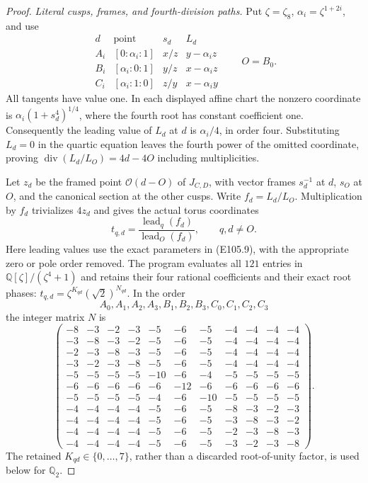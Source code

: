 \begin{proof}
\emph{Literal cusps, frames, and fourth-division paths.}
Put $\zeta=\zeta_8$, $\alpha_i=\zeta^{1+2i}$, and use
\[
 \begin{array}{c|c|c|c}
 d&\text{point}&s_d&L_d\\ \hline
 A_i&[0:\alpha_i:1]&x/z&y-\alpha_i z\\
 B_i&[\alpha_i:0:1]&y/z&x-\alpha_i z\\
 C_i&[\alpha_i:1:0]&z/y&x-\alpha_i y
 \end{array}
 \qquad O=B_0.
 \tag{E105.9}
\]
All tangents have value one.  In each displayed affine chart
the nonzero coordinate is $\alpha_i(1+s_d^4)^{1/4}$, where
the fourth root has constant coefficient one.  Consequently
the leading value of $L_d$ at $d$ is $\alpha_i/4$, in order
four.  Substituting $L_d=0$ in the quartic equation leaves
the fourth power of the omitted coordinate, proving
$\operatorname{div}(L_d/L_O)=4d-4O$ including multiplicities.

Let $z_d$ be the framed point $\mathcal O(d-O)$ of $J_{C,D}$,
with vector frames $s_d^{-1}$ at $d$, $s_O$ at $O$, and the
canonical section at the other cusps.  Write $f_d=L_d/L_O$.
Multiplication by $f_d$ trivializes $4z_d$ and gives the
actual torus coordinates
\[
 t_{q,d}=
 \frac{\operatorname{lead}_q(f_d)}{\operatorname{lead}_O(f_d)},
       \qquad q,d\ne O.
 \tag{E105.10}
\]
Here leading values use the exact parameters in (E105.9),
with the appropriate zero or pole order removed.
The program evaluates all $121$ entries in
$\mathbb Q[\zeta]/(\zeta^4+1)$ and retains their four rational
coefficients and their exact root phases:
$t_{q,d}=\zeta^{K_{qd}}(\sqrt2)^{N_{qd}}$.
In the order
\[
        A_0,A_1,A_2,A_3,B_1,B_2,B_3,C_0,C_1,C_2,C_3
 \tag{E105.11}
\]
the integer matrix $N$ is
\[
\left(\begin{array}{rrrrrrrrrrr}
-8&-3&-2&-3&-5&-6&-5&-4&-4&-4&-4\\
-3&-8&-3&-2&-5&-6&-5&-4&-4&-4&-4\\
-2&-3&-8&-3&-5&-6&-5&-4&-4&-4&-4\\
-3&-2&-3&-8&-5&-6&-5&-4&-4&-4&-4\\
-5&-5&-5&-5&-10&-6&-4&-5&-5&-5&-5\\
-6&-6&-6&-6&-6&-12&-6&-6&-6&-6&-6\\
-5&-5&-5&-5&-4&-6&-10&-5&-5&-5&-5\\
-4&-4&-4&-4&-5&-6&-5&-8&-3&-2&-3\\
-4&-4&-4&-4&-5&-6&-5&-3&-8&-3&-2\\
-4&-4&-4&-4&-5&-6&-5&-2&-3&-8&-3\\
-4&-4&-4&-4&-5&-6&-5&-3&-2&-3&-8
\end{array}\right).
 \tag{E105.12}
\]
The retained $K_{qd}\in\{0,\ldots,7\}$, rather than a
discarded root-of-unity factor, is used below for $\mathbb Q_2$.


\end{proof}
